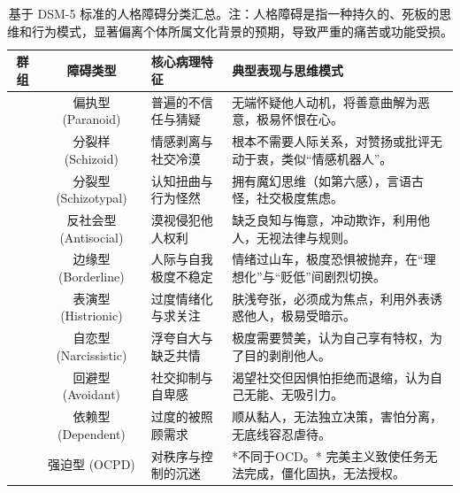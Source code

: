 \documentclass[UTF8,letter,10pt]{ctexart}
\begin{document}
\begin{table}[h!]
\caption[基于 DSM-5 标准的人格障碍分类汇总]{基于 DSM-5 标准的人格障碍分类汇总。注：人格障碍是指一种持久的、死板的思维和行为模式，显著偏离个体所属文化背景的预期，导致严重的痛苦或功能受损。}
    \centering
    \renewcommand{\arraystretch}{1.6}
    \footnotesize
    \begin{tabular}{c c L{3.5cm} L{8cm}}
        \toprule
        \textbf{群组} & \textbf{障碍类型} & \textbf{核心病理特征} & \textbf{典型表现与思维模式} \\
        \midrule

        & 偏执型 (Paranoid) & 普遍的不信任与猜疑 & 无端怀疑他人动机，将善意曲解为恶意，极易怀恨在心。 \\
        & 分裂样 (Schizoid) & 情感剥离与社交冷漠 & 根本不需要人际关系，对赞扬或批评无动于衷，类似``情感机器人''。 \\
        & 分裂型 (Schizotypal) & 认知扭曲与行为怪然 & 拥有魔幻思维（如第六感），言语古怪，社交极度焦虑。 \\
        \midrule

        & 反社会型 (Antisocial) & 漠视侵犯他人权利 & 缺乏良知与悔意，冲动欺诈，利用他人，无视法律与规则。 \\
        & 边缘型 (Borderline) & 人际与自我极度不稳定 & 情绪过山车，极度恐惧被抛弃，在``理想化''与``贬低''间剧烈切换。 \\
        & 表演型 (Histrionic) & 过度情绪化与求关注 & 肤浅夸张，必须成为焦点，利用外表诱惑他人，极易受暗示。 \\
        & 自恋型 (Narcissistic) & 浮夸自大与缺乏共情 & 极度需要赞美，认为自己享有特权，为了目的剥削他人。 \\
        \midrule

        & 回避型 (Avoidant) & 社交抑制与自卑感 & 渴望社交但因惧怕拒绝而退缩，认为自己无能、无吸引力。 \\
        & 依赖型 (Dependent) & 过度的被照顾需求 & 顺从黏人，无法独立决策，害怕分离，无底线容忍虐待。 \\
        & 强迫型 (OCPD) & 对秩序与控制的沉迷 & *不同于OCD。* 完美主义致使任务无法完成，僵化固执，无法授权。 \\

        \bottomrule
    \end{tabular}
\end{table}
\end{document}
